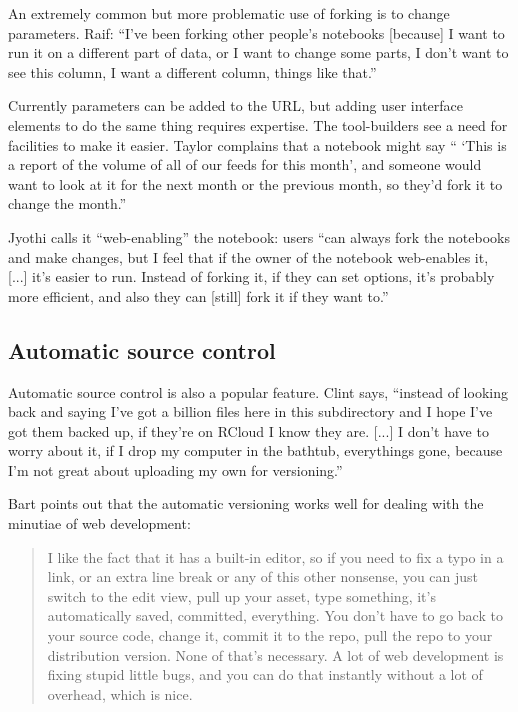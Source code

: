 
An extremely common but more problematic use of forking is to
change parameters. Raif: ``I've been forking other people's notebooks [because]
I want to run it on a different part of data, or I want to change some parts, I
don't want to see this column, I want a different column, things like that.''

Currently parameters can be added to the URL, but adding user interface elements
to do the same thing requires expertise. The tool-builders see a need for
facilities to make it easier. Taylor complains that a notebook might say ``
`This is a report of the volume of all of our feeds for this month', and someone
would want to look at it for the next month or the previous month, so they'd
fork it to change the month.''

Jyothi calls it ``web-enabling'' the notebook: users ``can always fork the
notebooks and make changes, but I feel that if the owner of the notebook
web-enables it, [...] it's easier to run. Instead of
forking it, if they can set options, it's probably more efficient, and also they
can [still] fork it if they want to.''


\subsection{Automatic source control}

Automatic source control is also a popular feature. Clint says, ``instead of
looking back and saying I've got a billion files here in this subdirectory and I
hope I've got them backed up, if they're on RCloud I know they are. [...] I
don't have to worry about it, if I drop my computer in the bathtub, everythings
gone, because I'm not great about uploading my own for versioning.''

Bart points out that the automatic versioning works well for dealing with the
minutiae of web development:
\begin{quote}
I like the fact that it has a built-in editor, so
if you need to fix a typo in a link, or an extra line break or any of this other
nonsense, you can just switch to the edit view, pull up your asset, type
something, it's automatically saved, committed, everything. You don't have to go
back to your source code, change it, commit it to the repo, pull the repo to
your distribution version. None of that's necessary. A lot of web development is
fixing stupid little bugs, and you can do that instantly without a lot of
overhead, which is nice.
\end{quote}


